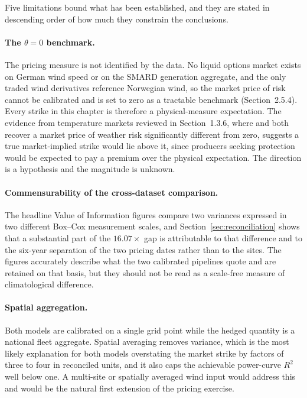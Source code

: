 \documentclass[11pt, a4paper, twoside]{article}
\begin{document}
Five limitations bound what has been established, and they are stated in descending order of how much they constrain the conclusions.

\paragraph{The $\theta = 0$ benchmark.} The pricing measure is not identified by the data. No liquid options market exists on German wind speed or on the SMARD generation aggregate, and the only traded wind derivatives reference Norwegian wind, so the market price of risk cannot be calibrated and is set to zero as a tractable benchmark (Section~2.5.4). Every strike in this chapter is therefore a physical-measure expectation. The evidence from temperature markets reviewed in Section~1.3.6, where \citet{HardleLopezCabrera2009} and \citet{DorfleitnerWimmer2010} both recover a market price of weather risk significantly different from zero, suggests a true market-implied strike would lie above it, since producers seeking protection would be expected to pay a premium over the physical expectation. The direction is a hypothesis and the magnitude is unknown.

\paragraph{Commensurability of the cross-dataset comparison.} The headline Value of Information figures compare two variances expressed in two different Box--Cox measurement scales, and Section~\ref{sec:reconciliation} shows that a substantial part of the $16.07\times$ gap is attributable to that difference and to the six-year separation of the two pricing dates rather than to the sites. The figures accurately describe what the two calibrated pipelines quote and are retained on that basis, but they should not be read as a scale-free measure of climatological difference.

\paragraph{Spatial aggregation.} Both models are calibrated on a single grid point while the hedged quantity is a national fleet aggregate. Spatial averaging removes variance, which is the most likely explanation for both models overstating the market strike by factors of three to four in reconciled units, and it also caps the achievable power-curve $R^2$ well below one. A multi-site or spatially averaged wind input would address this and would be the natural first extension of the pricing exercise.
\end{document}
